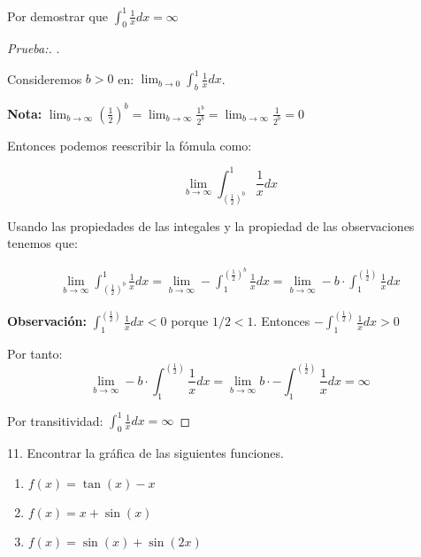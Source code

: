\documentclass[12pt]{article}
\begin{document}
Por demostrar que \(\displaystyle\int_0^1\frac{1}{x}dx = \infty\)

\begin{proof}[Prueba:]
    . \medskip

    Consideremos $b>0$ en: \(\displaystyle\lim_{b\to0}\int_b^1\frac{1}{x}dx\).\medskip

    \textbf{Nota:} \(\displaystyle\lim_{b\to\infty}\left(\frac{1}{2}\right)^b = \lim_{b\to\infty} \frac{1^b}{2^b} = \lim_{b\to\infty} \frac{1}{2^b} = 0\)\bigskip

    Entonces podemos reescribir la f\'omula como:

    \[\lim_{b\to\infty}\int_{\left(\frac{1}{2}\right)^b}^1\frac{1}{x}dx\]

    Usando las propiedades de las integales y la propiedad de las observaciones tenemos que:

    \begin{align*}
        \lim_{b\to\infty}\int_{\left(\frac{1}{2}\right)^b}^1\frac{1}{x}dx = \lim_{b\to\infty}-\int^{\left(\frac{1}{2}\right)^b}_1\frac{1}{x}dx = \lim_{b\to\infty}-b\cdot\int^{\left(\frac{1}{2}\right)}_1\frac{1}{x}dx
    \end{align*}

    \textbf{Observaci\'on:} \(\displaystyle\int^{\left(\frac{1}{2}\right)}_1\frac{1}{x}dx <0\) porque \(1/2<1\). Entonces \(\displaystyle-\int^{\left(\frac{1}{2}\right)}_1\frac{1}{x}dx >0\)\bigskip

    Por tanto:
    \[\lim_{b\to\infty}-b\cdot \int^{\left(\frac{1}{2}\right)}_1\frac{1}{x}dx  = \lim_{b\to\infty}b\cdot -\int^{\left(\frac{1}{2}\right)}_1\frac{1}{x}dx = \infty\]

    Por transitividad: \qquad \(\displaystyle\int_0^1\frac{1}{x}dx = \infty\)\medskip

\end{proof}

11. Encontrar la gr\'afica de las siguientes funciones.

\begin{enumerate}[\hspace{9px} a)]
    \item \(f(x)=\tan(x)-x\)

    \item \(f(x)=x+\sin(x)\)

    \item \(f(x)=\sin(x)+\sin(2x)\)

\end{enumerate}
\end{document}
